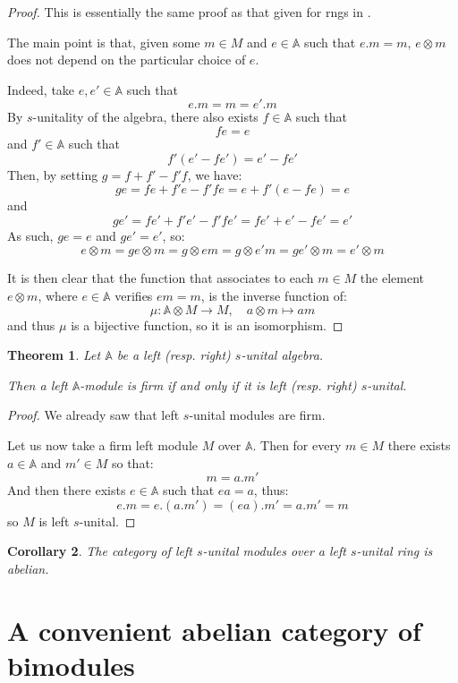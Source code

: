 \documentclass[a4paper,fleqn]{cas-sc}
\newtheorem{thm}{Theorem}%
\newtheorem{cor}[thm]{Corollary}
\newcommand{\bA}{\mathbb{A}}
\begin{document}
\begin{proof}
This is essentially the same proof as that given for rngs in \cite{thfmn}.

The main point is that, given some $m \in M$ and $e \in \bA$ such that $e.m = m$, $e \otimes m$ does not depend on the particular choice of $e$.

Indeed, take $e, e' \in \bA$ such that
\[e.m =  m = e'.m \]
By $s$-unitality of the algebra, there also exists $f \in \bA$ such  that
\[fe = e\]
\noindent and $f' \in \bA$ such that
\[f'(e' - fe') = e' - fe' \]
Then, by setting $g = f + f' - f'f$, we have:
\[
ge = fe + f'e - f'fe = e + f'(e - fe) = e
\]
\noindent and
\[
ge' = fe' + f'e' - f'fe' = fe' + e'-fe' = e'
\]
As such, $ge = e$ and $ge' = e'$, so:
\[
e \otimes m = ge \otimes m
= g \otimes em = g \otimes e' m
= ge' \otimes m = e' \otimes m
\]

It is then clear that the function that associates to each $m \in M$ the element $e \otimes m$, where $e \in \bA$ verifies $em = m$, is the inverse function of:
\[
\mu : \bA \otimes M \to M, \quad a \otimes m \mapsto am
\]
\noindent and thus $\mu$ is a bijective function, so it is an isomorphism.
\end{proof}

\begin{thm}
Let $\bA$ be a left (resp. right) $s$-unital algebra.

Then a left $\bA$-module is firm if and only if it is left (resp. right) $s$-unital.
\end{thm}

\begin{proof}
We already saw that left $s$-unital modules are firm.

Let us now take a firm left module $M$ over $\bA$.
Then for every $m \in M$ there exists $a \in \bA$ and $m' \in M$ so that:
\[m = a.m'\]
And then there exists $e \in \bA$ such that $ea = a$, thus:
\[e.m = e.(a.m') =(ea).m' = a.m' = m\]
so $M$ is left $s$-unital.
\end{proof}

\begin{cor}
\label{cor:10}
The category of left $s$-unital modules over a left $s$-unital ring is abelian.
\end{cor}

\section{A convenient abelian category of bimodules}
\end{document}
